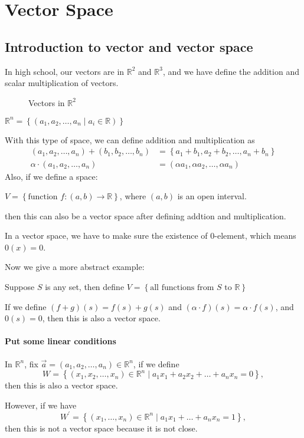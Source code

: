 \chapter{Vector Space}
\section{Introduction to vector and vector space}
In high school, our vectors are in \(\mathbb{R} ^2\) and \(\mathbb{R} ^3\), and we have define the addition and scalar multiplication of vectors.  
\begin{figure}[H]
    \centering
    \caption{Vectors in \(\mathbb{R} ^2\)}
    \label{fig:vec}
\end{figure}
\begin{eg}
    \(\mathbb{R} ^n = \left\{ \left( a_1, a_2, \dots , a_n \mid a_i \in \mathbb{R}  \right)  \right\} \) 
\end{eg}
With this type of space, we can define addition and multiplication as 
\begin{align*}
    \left( a_1, a_2, \dots ,a_n \right) + \left( b_1, b_2, \dots , b_n \right) &= \left\{ a_1 + b_1, a_2 + b_2, \dots , a_n + b_n \right\} \\
    \alpha \cdot \left( a_1, a_2, \dots ,a_n \right) &= \left( \alpha a_1, \alpha a_2, \dots , \alpha a_n \right)  
\end{align*}
Also, if we define a space:
\begin{eg}
    \(V = \left\{ \text{function } f:(a,b) \to \mathbb{R}  \right\} \), where \((a,b)\) is an open interval.  
\end{eg}
then this can also be a vector space after defining addtion and multiplication.
\begin{note}
    In a vector space, we have to make sure the existence of \(0\)-element, which means \(0(x) = 0\). 
\end{note}
Now we give a more abstract example:
\begin{eg}
    Suppose \(S\) is any set, then define \(V = \left\{ \text{all functions from } S \text{ to } \mathbb{R} \right\} \)  
\end{eg}
If we define \((f + g)(s) = f(s) + g(s)\) and \((\alpha \cdot f)(s) = \alpha \cdot f(s)\), and \(0(s) = 0\), then this is also a vector space. 

\subsubsection{Put some linear conditions}
\begin{eg}
    In \(\mathbb{R} ^n\), fix \(\vec{a}=\left( a_1, a_2, \dots , a_n \right) \in \mathbb{R} ^n \), if we define 
\[
    W = \left\{ (x_1, x_2, \dots ,x_n) \in \mathbb{R} ^n \mid a_1 x_1 + a_{2} x_2 + \dots + a_n x_n = 0  \right\}, 
\] then this is also a vector space.
\end{eg}
However, if we have 
\[
    W^{\prime} = \left\{ (x_1, \dots , x_n) \in \mathbb{R} ^n \mid a_1 x_1 + \dots +a_n x_n = 1\right\},
\]
then this is not a vector space because it is not close.

